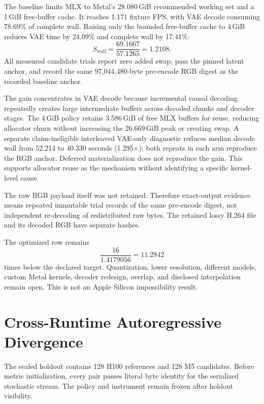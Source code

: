 \documentclass[10pt,twocolumn]{article}
\begin{document}
The baseline limits MLX to Metal's 28.080\,GiB recommended working set and a 1\,GiB free-buffer cache. It reaches 1.171 fixture FPS, with VAE decode consuming 78.69\% of complete wall. Raising only the bounded free-buffer cache to 4\,GiB reduces VAE time by 24.09\% and complete wall by 17.41\%:
\begin{equation}
S_{\mathrm{wall}}=\frac{69.1667}{57.1265}=1.2108.
\end{equation}
All measured candidate trials report zero added swap, pass the pinned latent anchor, and record the same 97,044,480-byte pre-encode RGB digest as the recorded baseline anchor.

The gain concentrates in VAE decode because incremental causal decoding repeatedly creates large intermediate buffers across decoded chunks and decoder stages. The 4\,GiB policy retains 3.586\,GiB of free MLX buffers for reuse, reducing allocator churn without increasing the 26.669\,GiB peak or creating swap. A separate claim-ineligible interleaved VAE-only diagnostic reduces median decode wall from 52.214 to 40.330 seconds (1.295$\times$); both repeats in each arm reproduce the RGB anchor. Deferred materialization does not reproduce the gain. This supports allocator reuse as the mechanism without identifying a specific kernel-level cause.

The raw RGB payload itself was not retained. Therefore exact-output evidence means repeated immutable trial records of the same pre-encode digest, not independent re-decoding of redistributed raw bytes. The retained lossy H.264 file and its decoded RGB have separate hashes.

The optimized row remains
\begin{equation}
\frac{16}{1.4179056}=11.2842
\end{equation}
times below the declared target. Quantization, lower resolution, different models, custom Metal kernels, decoder redesign, overlap, and disclosed interpolation remain open. This is not an Apple Silicon impossibility result.

\section{Cross-Runtime Autoregressive Divergence}
The sealed holdout contains 128 H100 references and 128 M5 candidates. Before metric initialization, every pair passes literal byte identity for the serialized stochastic stream. The policy and instrument remain frozen after holdout visibility.
\end{document}

